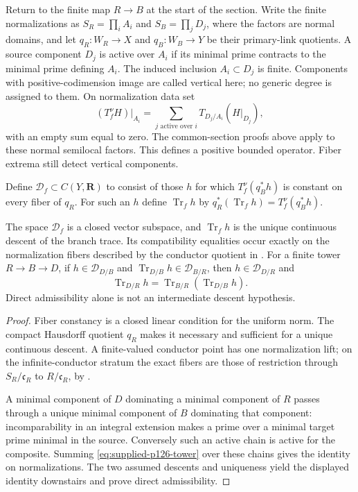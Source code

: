 Return to the finite map $R\to B$ at the start of the section. Write
the finite normalizations as $S_R=\prod_iA_i$ and $S_B=\prod_jD_j$,
where the factors are normal domains, and let $q_R:W_R\to X$ and
$q_B:W_B\to Y$ be their primary-link quotients. A source component $D_j$
is active over $A_i$ if its minimal prime contracts to the minimal prime
defining $A_i$. The induced inclusion $A_i\subset D_j$ is finite.
Components with positive-codimension image are called vertical here;
no generic degree is assigned to them. On normalization data set
\[
 (T_f^\nu H)|_{A_i}=\sum_{j\text{ active over }i}T_{D_j/A_i}(H|_{D_j}),
 \tag{70.7i}\label{eq:supplied-p126-branch-trace}
\]
with an empty sum equal to zero. The common-section proofs above apply
to these normal semilocal factors. This defines a positive bounded
operator. Fiber extrema still detect vertical components.

Define $\mathcal D_f\subset C(Y,\mathbf R)$ to consist of those $h$ for
which $T_f^\nu(q_B^*h)$ is constant on every fiber of $q_R$.
For such an $h$ define $\operatorname{Tr}_fh$ by
$q_R^*(\operatorname{Tr}_fh)=T_f^\nu(q_B^*h)$.

\begin{theorem}\label{thm:supplied-p126-conductor-trace}
The space $\mathcal D_f$ is a closed vector subspace, and
$\operatorname{Tr}_fh$ is the unique continuous descent of the branch
trace. Its compatibility equalities occur exactly on the normalization
fibers described by the conductor quotient in
.
For a finite tower $R\to B\to D$, if $h\in\mathcal D_{D/B}$ and
$\operatorname{Tr}_{D/B}h\in\mathcal D_{B/R}$, then
$h\in\mathcal D_{D/R}$ and
\[
 \operatorname{Tr}_{D/R}h
   =\operatorname{Tr}_{B/R}(\operatorname{Tr}_{D/B}h).
\]
Direct admissibility alone is not an intermediate descent hypothesis.
\end{theorem}

\begin{proof}
Fiber constancy is a closed linear condition for the uniform norm.
The compact Hausdorff quotient $q_R$ makes it necessary and sufficient
for a unique continuous descent. A finite-valued conductor point has
one normalization lift; on the infinite-conductor stratum the exact
fibers are those of restriction through $S_R/\mathfrak c_R$ to
$R/\mathfrak c_R$, by .

A minimal component of $D$ dominating a minimal component of $R$ passes
through a unique minimal component of $B$ dominating that component:
incomparability in an integral extension makes a prime over a minimal
target prime minimal in the source. Conversely such an active chain
is active for the composite. Summing \eqref{eq:supplied-p126-tower}
over these chains gives the identity on normalizations. The two assumed
descents and uniqueness yield the displayed identity downstairs and
prove direct admissibility.
\end{proof}

